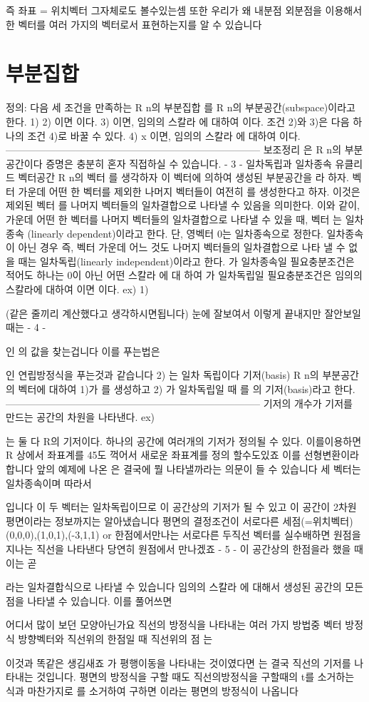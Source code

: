 \documentclass{oblivoir}
\begin{document}
즉 좌표 = 위치벡터 그자체로도 볼수있는셈
또한 우리가 왜 내분점 외분점을 이용해서 한 벡터를 여러 가지의 벡터로서 표현하는지를 알 수 있습니다






\section{부분집합}

정의:
다음 세 조건을 만족하는 R n의 부분집합 를 R n의 부분공간(subspace)이라고 한다.
1)  
2) 이면 이다.
3)  이면, 임의의 스칼라 에 대하여  이다.
조건 2)와 3)은 다음 하나의 조건 4)로 바꿀 수 있다.
4) x 이면, 임의의 스칼라 에 대하여 이다.
-----------------------------------------------------------------------------
보조정리
 은 R n의 부분공간이다
증명은 충분히 혼자 직접하실 수 있습니다.
- 3 -
일차독립과 일차종속
유클리드 벡터공간 R n의 벡터 를 생각하자 이 벡터에 의하여 생성된 부분공간을  라
하자.
벡터 가운데 어떤 한 벡터를 제외한 나머지 벡터들이 여전히 를 생성한다고 하자.
이것은 제외된 벡터 를 나머지 벡터들의 일차결합으로 나타낼 수 있음을 의미한다.
이와 같이, 가운데 어떤 한 벡터를 나머지 벡터들의 일차결합으로 나타낼 수 있을 때,
벡터 는 일차종속 (linearly dependent)이라고 한다.
단, 영벡터 0는 일차종속으로 정한다.
일차종속이 아닌 경우 즉, 벡터 가운데 어느 것도 나머지 벡터들의 일차결합으로 나타
낼 수 없을 때는 일차독립(linearly independent)이라고 한다.
가 일차종속일 필요충분조건은 적어도 하나는 0이 아닌 어떤 스칼라 에 대
하여 
가 일차독립일 필요충분조건은 임의의 스칼라에 대하여
 이면 이다.
ex)
1)

(같은 줄끼리 계산했다고 생각하시면됩니다)
눈에 잘보여서 이렇게 끝내지만 잘안보일때는
- 4 -

  인    의 값을 찾는겁니다
이를 푸는법은

    
      
인 연립방정식을 푸는것과 같습니다
2)  는 일차 독립이다
기저(basis)
R n의 부분공간의 벡터에 대하여
1)가 를 생성하고
2) 가 일차독립일 때
를 의 기저(basis)라고 한다.
-----------------------------------------------------------------------------
기저의 개수가 기저를 만드는 공간의 차원을 나타낸다.
ex)

는 둘 다 R의 기저이다.
 하나의 공간에 여러개의 기저가 정의될 수 있다.
이를이용하면 R 상에서 좌표계를 45도 꺽어서 새로운 좌표계를 정의 할수도있죠
이를 선형변환이라합니다
앞의 예제에 나온
은 결국에 뭘 나타낼까라는 의문이 들 수 있습니다
세 벡터는 일차종속이며 따라서

입니다
이 두 벡터는 일차독립이므로 이 공간상의 기저가 될 수 있고 이 공간이 2차원 평면이라는 정보까지는
알아냈습니다
평면의 결정조건이 서로다른 세점(=위치벡터) (0,0,0),(1,0,1),(-3,1,1) or
한점에서만나는 서로다른 두직선 벡터를 실수배하면 원점을 지나는 직선을 나타낸다 당연히 원점에서
만나겠죠
- 5 -
이 공간상의 한점을라 했을 때 이는 곧

라는 일차결합식으로 나타낼 수 있습니다
임의의 스칼라 에 대해서 생성된 공간의 모든 점을 나타낼 수 있습니다.
이를 풀어쓰면

어디서 많이 보던 모양아닌가요
직선의 방정식을 나타내는 여러 가지 방법중
벡터 방정식
방향벡터와 직선위의 한점일 때 직선위의 점 는

이것과 똑같은 생김새죠
가 평행이동을 나타내는 것이였다면 는 결국 직선의 기저를 나타내는 것입니다.
평면의 방정식을 구할 때도 직선의방정식을 구할때의 t를 소거하는 식과 마찬가지로
를 소거하여 구하면
 이라는 평면의 방정식이 나옵니다
 
\end{document}
